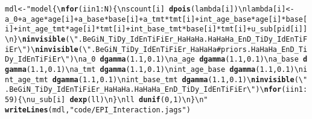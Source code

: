 \documentclass[12pt,letterpaper,oneside]{article}\usepackage{graphicx, color}
\makeatletter
\newcommand{\hlfunctioncall}[1]{\textcolor[rgb]{0.501960784313725,0,0.329411764705882}{\textbf{#1}}}%
\newcommand{\hlstring}[1]{\textcolor[rgb]{0.6,0.6,1}{#1}}%
\newenvironment{kframe}{%
 \def\at@end@of@kframe{}%
 \ifinner\ifhmode%
  \def\at@end@of@kframe{\end{minipage}}%
  \begin{minipage}{\columnwidth}%
 \fi\fi%
 \def\FrameCommand##1{\hskip\@totalleftmargin \hskip-\fboxsep
 \colorbox{shadecolor}{##1}\hskip-\fboxsep
     \hskip-\linewidth \hskip-\@totalleftmargin \hskip\columnwidth}%
 \MakeFramed {\advance\hsize-\width
   \@totalleftmargin\z@ \linewidth\hsize
   \@setminipage}}%
 {\par\unskip\endMakeFramed%
 \at@end@of@kframe}
\newenvironment{knitrout}{}{} %
\makeatother
\begin{document}
\begin{knitrout}\scriptsize
{}\color{fgcolor}\begin{kframe}
\begin{alltt}
mdl <- \hlstring{"model \{\textbackslash{}\hlfunctioncall{nfor} (i in 1:N) \{\textbackslash{}nscount[i] ~ \hlfunctioncall{dpois}(lambda[i])\textbackslash{}nlambda[i] <- a_0 + a_age*age[i] + a_base*base[i] + a_tmt*tmt[i] + int_age_base*age[i]*base[i] + int_age_tmt*age[i]*tmt[i] + int_base_tmt*base[i]*tmt[i] + u_sub[pid[i]]\textbackslash{}n\}\textbackslash{}\hlfunctioncall{ninvisible}(\textbackslash{}"}.BeGiN_TiDy_IdEnTiFiEr_HaHaHa.HaHaHa_EnD_TiDy_IdEnTiFiEr\textbackslash{}\hlstring{")\textbackslash{}\hlfunctioncall{ninvisible}(\textbackslash{}"}.BeGiN_TiDy_IdEnTiFiEr_HaHaHa# priors.HaHaHa_EnD_TiDy_IdEnTiFiEr\textbackslash{}\hlstring{")\textbackslash{}na_0        ~ \hlfunctioncall{dgamma}(1.1, 0.1)\textbackslash{}na_age      ~ \hlfunctioncall{dgamma}(1.1, 0.1)\textbackslash{}na_base     ~ \hlfunctioncall{dgamma}(1.1, 0.1)\textbackslash{}na_tmt      ~ \hlfunctioncall{dgamma}(1.1, 0.1)\textbackslash{}nint_age_base ~ \hlfunctioncall{dgamma}(1.1, 0.1)\textbackslash{}nint_age_tmt  ~ \hlfunctioncall{dgamma}(1.1, 0.1)\textbackslash{}nint_base_tmt ~ \hlfunctioncall{dgamma}(1.1, 0.1)\textbackslash{}\hlfunctioncall{ninvisible}(\textbackslash{}"}.BeGiN_TiDy_IdEnTiFiEr_HaHaHa.HaHaHa_EnD_TiDy_IdEnTiFiEr\textbackslash{}\hlstring{")\textbackslash{}\hlfunctioncall{nfor} (i in 1:59) \{\textbackslash{}nu_sub[i] ~ \hlfunctioncall{dexp}(ll)\textbackslash{}n\}\textbackslash{}nll ~ \hlfunctioncall{dunif}(0,1)\textbackslash{}n\}\textbackslash{}n"}
\hlfunctioncall{writeLines}(mdl, \hlstring{"code/EPI_Interaction.jags"})
\end{alltt}
\end{kframe}
\end{knitrout}
\end{document}
